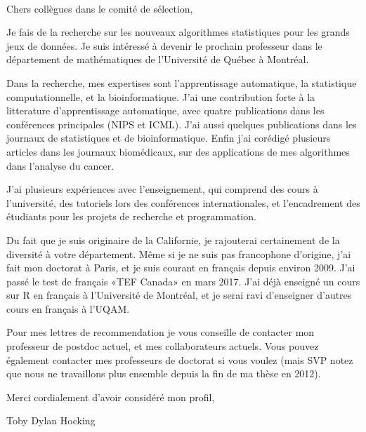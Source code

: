 \documentclass{article}
\begin{document}
\mbox{ }

Chers collègues dans le comité de sélection,

Je fais de la recherche sur les nouveaux algorithmes statistiques pour
les grands jeux de données. Je suis intéressé à devenir le prochain
professeur dans le département de mathématiques de l'Université de
Québec à Montréal.

Dans la recherche, mes expertises sont l'apprentissage automatique, la
statistique computationnelle, et la bioinformatique. J'ai une
contribution forte à la litterature d'apprentissage automatique, avec
quatre publications dans les conférences principales (NIPS et
ICML). J'ai aussi quelques publications dans les journaux de
statistiques et de bioinformatique. Enfin j'ai corédigé plusieurs
articles dans les journaux biomédicaux, sur des applications de mes
algorithmes dans l'analyse du cancer.

J'ai plusieurs expériences avec l'enseignement, qui comprend des cours
à l'université, des tutoriels lors des conférences internationales, et
l'encadrement des étudiants pour les projets de recherche et
programmation.

Du fait que je suis originaire de la Californie, je rajouterai
certainement de la diversité à votre département. Même si je ne
suis pas francophone d'origine, j'ai fait mon doctorat à Paris, et je
suis courant en français depuis environ 2009. J'ai passé le test de
français «TEF Canada» en mars 2017. J'ai déjà enseigné un cours sur R
en français à l'Université de Montréal, et je serai ravi d'enseigner d'autres cours
en français à l'UQAM.

Pour mes lettres de recommendation je vous conseille de contacter mon
professeur de postdoc actuel, et mes collaborateurs actuels. Vous
pouvez également contacter mes professeurs de doctorat si vous voulez
(mais SVP notez que nous ne travaillons plus ensemble depuis la fin de
ma thèse en 2012).

Merci cordialement d'avoir considéré mon profil, 

Toby Dylan Hocking
\end{document}
